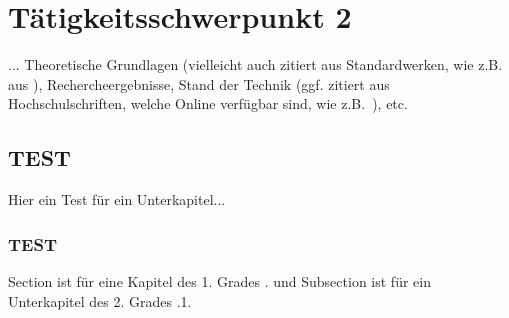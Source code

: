 \chapter{Tätigkeitsschwerpunkt 2}
\label{cha:Tätigkeitsschwerpunkt 2}

... Theoretische Grundlagen (vielleicht auch zitiert aus Standardwerken, wie z.B. aus \autocite{Tipler.2019}), Rechercheergebnisse, Stand der Technik  (ggf. zitiert aus Hochschulschriften, welche Online verfügbar sind, wie z.B.~\autocite{Ziegler.2017}), etc.

\section{TEST}
Hier ein Test für ein Unterkapitel...

\subsection{TEST}
Section ist für eine Kapitel des 1. Grades . und Subsection ist für ein Unterkapitel des 2. Grades .1.

\clearpage